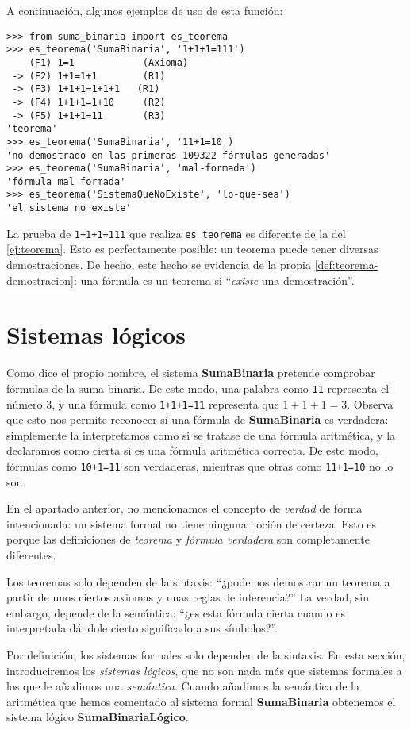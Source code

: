 A continuación, algunos ejemplos de uso de esta función:
\begin{lstlisting}[numbers=none,frame=none]
>>> from suma_binaria import es_teorema
>>> es_teorema('SumaBinaria', '1+1+1=111')
    (F1) 1=1            (Axioma)
 -> (F2) 1+1=1+1        (R1)
 -> (F3) 1+1+1=1+1+1   (R1)
 -> (F4) 1+1+1=1+10     (R2)
 -> (F5) 1+1+1=11       (R3)
'teorema'
>>> es_teorema('SumaBinaria', '11+1=10')
'no demostrado en las primeras 109322 fórmulas generadas'
>>> es_teorema('SumaBinaria', 'mal-formada')
'fórmula mal formada'
>>> es_teorema('SistemaQueNoExiste', 'lo-que-sea')
'el sistema no existe'
\end{lstlisting}
La prueba de \texttt{1+1+1=111} que realiza \texttt{es\_teorema} es diferente de la del \cref{ej:teorema}. Esto es perfectamente posible: un teorema puede tener diversas demostraciones. De hecho, este hecho se evidencia de la propia \cref{def:teorema-demostracion}: una fórmula es un teorema si ``\textit{existe} una demostración''.
\section{Sistemas lógicos}\label{sec:sistemas-logicos}

Como dice el propio nombre, el sistema \textbf{SumaBinaria} pretende comprobar fórmulas de la suma binaria. De este modo, una palabra como \texttt{11} representa el número $3$, y una fórmula como \texttt{1+1+1=11} representa que $1+1+1=3$. Observa que esto nos permite reconocer si una fórmula de \textbf{SumaBinaria} es verdadera: simplemente la interpretamos como si se tratase de una fórmula aritmética, y la declaramos como cierta si es una fórmula aritmética correcta. De este modo, fórmulas como \texttt{10+1=11} son verdaderas, mientras que otras como \texttt{11+1=10} no lo son.

En el apartado anterior, no mencionamos el concepto de \emph{verdad} de forma intencionada: un sistema formal no tiene ninguna noción de certeza. Esto es porque las definiciones de \emph{teorema} y \emph{fórmula verdadera} son completamente diferentes.

Los teoremas solo dependen de la sintaxis: ``¿podemos demostrar un teorema a partir de unos ciertos axiomas y unas reglas de inferencia?'' La verdad, sin embargo, depende de la semántica: ``¿es esta fórmula cierta cuando es interpretada dándole cierto significado a sus símbolos?''.

Por definición, los sistemas formales solo dependen de la sintaxis. En esta sección, introduciremos los \emph{sistemas lógicos}, que no son nada más que sistemas formales a los que le añadimos una \emph{semántica}. Cuando añadimos la semántica de la aritmética que hemos comentado al sistema formal \textbf{SumaBinaria} obtenemos el sistema lógico \textbf{SumaBinariaLógico}.

